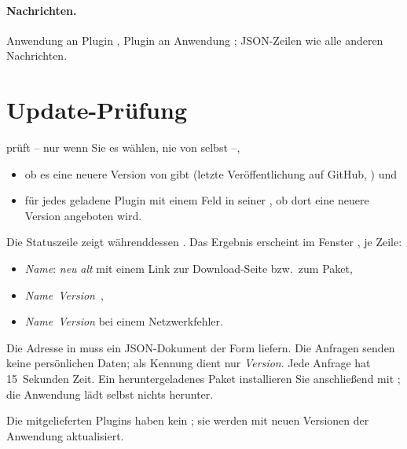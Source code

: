 \paragraph{Nachrichten.} Anwendung an Plugin ,
Plugin an Anwendung ; JSON-Zeilen wie alle
anderen Nachrichten.

\section{Update-Prüfung}\label{sec:verwaltung-updates}

 prüft – nur wenn Sie es wählen, nie von selbst –,

\begin{itemize}
  \item ob es eine neuere Version von \produkt{} gibt (letzte Veröffentlichung auf GitHub,
        ) und
  \item für jedes geladene Plugin mit einem Feld  in seiner
        , ob dort eine neuere Version angeboten wird.
\end{itemize}

Die Statuszeile zeigt währenddessen . Das Ergebnis erscheint im
Fenster , je Zeile:

\begin{itemize}
  \item \textit{Name}: \textit{neu}  \textit{alt}
        mit einem Link zur Download-Seite bzw.\ zum Paket,
  \item \textit{Name}~\textit{Version}~,
  \item \textit{Name}~\textit{Version} bei einem Netzwerkfehler.
\end{itemize}

Die Adresse in  muss ein JSON-Dokument der Form
 liefern. Die Anfragen
senden keine persönlichen Daten; als Kennung dient nur \textit{Version}.
Jede Anfrage hat 15~Sekunden Zeit. Ein heruntergeladenes Paket installieren Sie anschließend mit
; die Anwendung lädt selbst nichts herunter.

Die mitgelieferten Plugins haben kein ; sie werden mit neuen Versionen der
Anwendung aktualisiert.
